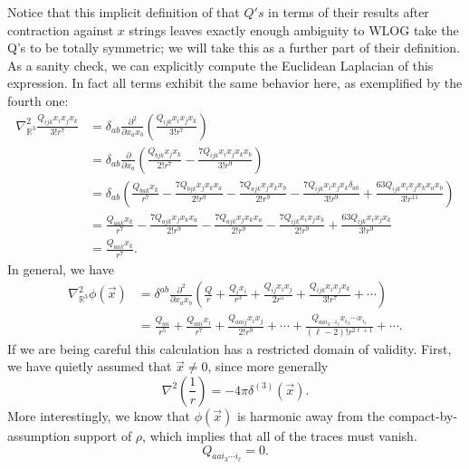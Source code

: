 \documentclass[11pt,letterpaper]{article}
\newcommand{\LP}{\left(}
\newcommand{\RP}{\right)}
\newcommand{\R}{\mathbb{R}}
\newcommand{\PA}[2]{\frac{\partial #1}{\partial #2}}
\begin{document}
Notice that this implicit definition of that $Q's$ in terms of their results after contraction against $x$ strings leaves exactly enough ambiguity to WLOG take the Q's to be totally symmetric; we will take this as a further part of their definition. As a sanity check, we can explicitly compute the Euclidean Laplacian of this expression. In fact all terms exhibit the same behavior here, as exemplified by the fourth one: \begin{equation}
\begin{aligned}
\nabla^2_{\R^3} \frac{Q_{ijk} x_i x_j x_k}{3! r^7} & = \delta_{ab} \PA{^2}{x_a x_b} \LP \frac{Q_{ijk} x_i x_j x_k}{3! r^7} \RP \\
& =  \delta_{ab} \PA{}{x_a} \LP \frac{Q_{bjk} x_j x_k}{2! r^7}  - \frac{7 Q_{ijk} x_i x_j x_k x_b}{3! r^9} \RP \\
& = \delta_{ab} \LP \frac{Q_{ba k} x_k}{r^7} - \frac{7 Q_{bjk} x_j x_k x_a}{2! r^9} - \frac{7 Q_{ajk} x_j x_k x_b}{2! r^9} - \frac{7 Q_{ijk} x_i x_j x_k \delta_{ab}}{3! r^9} + \frac{63 Q_{ijk} x_i x_j x_k x_a x_b}{3! r^{11}} \RP \\
& = \frac{Q_{aa k} x_k}{r^7} - \frac{7 Q_{ajk} x_j x_k x_a}{2! r^9} - \frac{7 Q_{ajk} x_j x_k x_a}{2! r^9} - \frac{7 Q_{ijk} x_i x_j x_k}{2! r^9} + \frac{63 Q_{ijk} x_i x_j x_k}{3! r^9} \\
& = \frac{Q_{aak} x_k}{r^7}.
\end{aligned}
\end{equation}
In general, we have \begin{equation}
\begin{aligned}
\nabla^2_{\R^3} \phi(\vec{x}) & = \delta^{ab} \PA{^2}{x_a x_b} \LP \frac{Q}{r} + \frac{Q_i x_i}{r^3} + \frac{Q_{ij} x_i x_j}{2 r^5} + \frac{Q_{ijk} x_i x_j x_k}{3! r^7} + \cdots \RP \\
& = \frac{Q_{aa}}{r^5} + \frac{Q_{aai}x_i}{r^7} + \frac{Q_{aaij} x_i x_j}{2! r^9} + \cdots + \frac{Q_{aa i_3 \cdots i_{\ell}} x_{i_3} \cdots x_{i_\ell}}{(\ell - 2)! r^{2 \ell + 1}} + \cdots .
\end{aligned}
\end{equation}
If we are being careful this calculation has a restricted domain of validity. First, we have quietly assumed that $\vec{x} \neq 0$, since more generally \begin{equation}
\nabla^2 \LP \frac{1}{r} \RP = - 4 \pi \delta^{(3)}(\vec{x}).
\end{equation}
More interestingly, we know that $\phi(\vec{x})$ is harmonic away from the compact-by-assumption support of $\rho$, which implies that all of the traces must vanish. \begin{equation}
Q_{aa i_3 \cdots i_\ell} = 0.
\end{equation}
\end{document}
